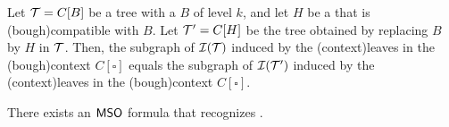 	
\begin{fact}
  \label{fact:bough-replacement}
  Let $\t = C[B]$ be a tree with a  $B$ of level $k$, 
  and let $H$ be a  that is \kl(bough){compatible}
  with $B$. Let $\t' = C[H]$ be the tree obtained by replacing $B$ by $H$ in $\t$.
  Then, the subgraph of $\someInterp(\t)$ induced by the \kl(context){leaves} in 
  the \kl(bough){context} $C[\square]$ equals the 
  subgraph of $\someInterp(\t')$ induced by the \kl(context){leaves} in
  the \kl(bough){context} $C[\square]$.
\end{fact}



\begin{lemma}[name={},restate={lem:recognizing-perfect-boughs}]
  \label{lem:recognizing-perfect-boughs}
  There exists an $\mathsf{MSO}$ formula that recognizes .
\end{lemma}

